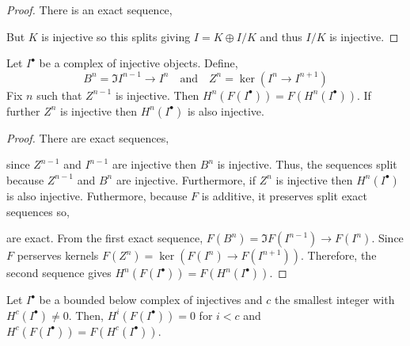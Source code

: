 \documentclass[12pt]{article}
\begin{document}
\begin{proof}
There is an exact sequence,
\begin{center}
\end{center}
But $K$ is injective so this splits giving $I = K \oplus I/K$ and thus $I/K$ is injective.
\end{proof}

\begin{lemma}
Let $I^\bullet$ be a complex of injective objects. Define, 
\[ B^n = \Im{I^{n-1} \to I^n} \quad \text{and} \quad Z^n = \ker{(I^n \to I^{n+1})} \]
Fix $n$ such that $Z^{n-1}$ is injective. Then $H^n(F(I^\bullet)) = F(H^n(I^\bullet))$. If further $Z^n$ is injective then $H^n(I^\bullet)$ is also injective.
\end{lemma}

\begin{proof}
There are exact sequences,
\begin{center}
\end{center}
since $Z^{n-1}$ and $I^{n-1}$ are injective then $B^n$ is injective. Thus, the sequences split because $Z^{n-1}$ and $B^n$ are injective. Furthermore, if $Z^n$ is injective then $H^n(I^\bullet)$ is also injective. Futhermore, because $F$ is additive, it preserves split exact sequences so,
\begin{center}
\end{center}
are exact. From the first exact sequence, $F(B^n) = \Im{F(I^{n-1}) \to F(I^n)}$. Since $F$ perserves kernels $F(Z^n) = \ker{(F(I^n) \to F(I^{n+1}))}$. Therefore, the second sequence gives $H^n(F(I^\bullet)) = F(H^n(I^\bullet))$.
\end{proof}

\begin{lemma} \label{compute_first_nonzero_cohomology}
Let $I^\bullet$ be a bounded below complex of injectives and $c$ the smallest integer with $H^c(I^\bullet) \neq 0$. Then, $H^i(F(I^\bullet)) = 0$ for $i < c$ and $H^c(F(I^\bullet)) = F(H^c(I^\bullet))$.
\end{lemma}
\end{document}
